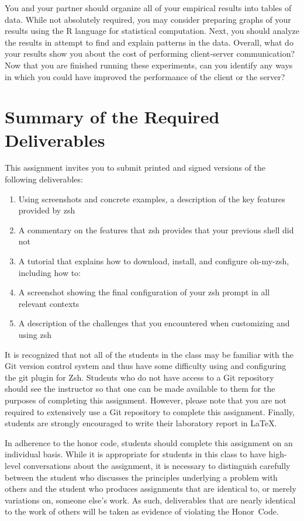You and your partner should organize all of your empirical results into tables of data. While not absolutely required,
you may consider preparing graphs of your results using the R language for statistical computation. Next, you should
analyze the results in attempt to find and explain patterns in the data. Overall, what do your results show you about
the cost of performing client-server communication? Now that you are finished running these experiments, can you
identify any ways in which you could have improved the performance of the client or the server?

\section*{Summary of the Required Deliverables}

This assignment invites you to submit printed and signed versions of the following deliverables:

\begin{enumerate}

    \item Using screenshots and concrete examples, a description of the key features provided by zsh

    \item A commentary on the features that zsh provides that your previous shell did not

    \item A tutorial that explains how to download, install, and configure oh-my-zsh, including how to:

    \item A screenshot showing the final configuration of your zsh prompt in all relevant contexts

    \item A description of the challenges that you encountered when customizing and using zsh

\end{enumerate}

It is recognized that not all of the students in the class may be familiar with the Git version control system and thus have some
difficulty using and configuring the git plugin for Zsh.  Students who do not have access to a Git repository should see the
instructor so that one can be made available to them for the purposes of completing this assignment. However, please note that you
are not required to extensively use a Git repository to complete this assignment. Finally, students are strongly encouraged to
write their laboratory report in \LaTeX.

In adherence to the honor code, students should complete this assignment on an individual basis. While it is appropriate for
students in this class to have high-level conversations about the assignment, it is necessary to distinguish carefully between the
student who discusses the principles underlying a problem with others and the student who produces assignments that are identical
to, or merely variations on, someone else's work.  As such, deliverables that are nearly identical to the work of others will be
taken as evidence of violating the \mbox{Honor Code}.


